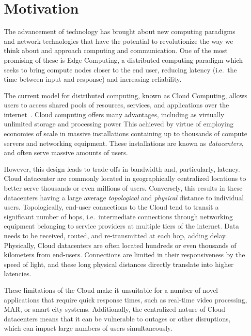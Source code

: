 \section{Motivation}

The advancement of technology has brought about new computing paradigms and network technologies that have the potential to revolutionize the way we think about and approach computing and communication.
One of the most promising of these is Edge Computing, a distributed computing paradigm which seeks to bring compute nodes closer to the end user, reducing latency (i.e.\ the time between input and response) and increasing reliability.

The current model for distributed computing, known as Cloud Computing, allows users to access shared pools of resources, services, and applications over the internet~\cite{gai2012towards}.
Cloud computing offers many advantages, including as virtually unlimited storage and processing power
This achieved by virtue of employing economies of scale in massive installations containing up to thousands of compute servers and networking equipment.
These installations are known as \emph{datacenters}, and often serve massive amounts of users.

However, this design leads to trade-offs in bandwidth and, particularly, latency.
Cloud datacenter are commonly located in geographically centralized locations to better serve thousands or even millions of users.
Conversely, this results in these datacenters having a large average \emph{topological} and \emph{physical} distance to individual users.
Topologically, end-user connections to the Cloud tend to transit a significant number of hops, i.e.\ intermediate connections through networking equipment belonging to service providers at multiple tiers of the internet.
Data needs to be received, routed, and re-transmitted at each hop, adding delay.
Physically, Cloud datacenters are often located hundreds or even thousands of kilometers from end-users.
Connections are limited in their responsiveness by the speed of light, and these long physical distances directly translate into higher latencies.

These limitations of the Cloud make it unsuitable for a number of novel applications that require quick response times, such as real-time video processing, \gls{MAR}, or smart city systems.
Additionally, the centralized nature of Cloud datacenters means that it can be vulnerable to outages or other disruptions, which can impact large numbers of users simultaneously.

